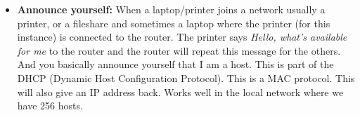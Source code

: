 \begin{itemize}[topsep=2pt]
    \item \textbf{Announce yourself:} When a laptop/printer joins a network usually a printer, or a fileshare and sometimes a laptop where the printer (for this instance) is connected to the router. The printer says \textit{Hello, what's available for me} to the router and the router will repeat this message for the others. And you basically announce yourself that I am a host. This is part of the DHCP (Dynamic Host Configuration Protocol). This is a MAC protocol. This will also give an IP address back. Works well in the local network where we have 256 hosts.
%
%
%
%
%
%
%
%
%
%
%
%

\end{itemize}
